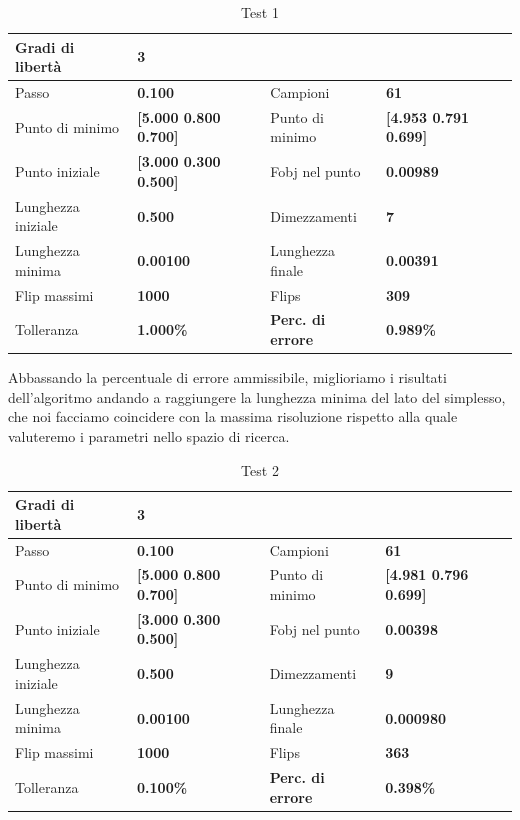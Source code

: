 \documentclass[a4paper, 11pt]{article}
\begin{document}
\begin{table}[h]
	\caption{Test 1}
	\begin{center}
	\begin{tabular}{|l|l|l|l|} 
	\hline 
	Gradi di libertà & \textbf{3} &  &  \\ \hline 
	Passo & \textbf{0.100} & Campioni & \textbf{61} \\ \hline 
	Punto di minimo & \textbf{{[}5.000 0.800 0.700{]}} & Punto di minimo & \textbf{{[}4.953 0.791 0.699{]}} \\ \hline 
	Punto iniziale & \textbf{{[}3.000 0.300 0.500{]}} & Fobj nel punto & \textbf{0.00989} \\ \hline 
	Lunghezza iniziale & \textbf{0.500} & Dimezzamenti & \textbf{7} \\ \hline 
	Lunghezza minima & \textbf{0.00100} & Lunghezza finale & \textbf{0.00391} \\ \hline
	Flip massimi & \textbf{1000} & Flips & \textbf{309} \\ \hline 
	Tolleranza & \textbf{1.000\%} & \textbf{Perc. di errore} & \textbf{0.989\%} \\ \hline 
	\end{tabular}
	\end{center}
	\end{table}

\noindent
Abbassando la percentuale di errore ammissibile, miglioriamo i risultati
dell'algoritmo andando a raggiungere la lunghezza minima del lato del simplesso,
che noi facciamo coincidere con la massima risoluzione rispetto alla quale
valuteremo i parametri nello spazio di ricerca.

\begin{table}[h] 
	\caption{Test 2}
	\begin{center}
	\begin{tabular}{|l|l|l|l|} 
	\hline 
	Gradi di libertà & \textbf{3} &  &  \\ \hline 
	Passo & \textbf{0.100} & Campioni & \textbf{61} \\ \hline 
	Punto di minimo & \textbf{{[}5.000 0.800 0.700{]}} & Punto di minimo & \textbf{{[}4.981 0.796 0.699{]}} \\ \hline 
	Punto iniziale & \textbf{{[}3.000 0.300 0.500{]}} & Fobj nel punto & \textbf{0.00398} \\ \hline 
	Lunghezza iniziale & \textbf{0.500} & Dimezzamenti & \textbf{9} \\ \hline 
	Lunghezza minima & \textbf{0.00100} & Lunghezza finale & \textbf{0.000980} \\ \hline
	Flip massimi & \textbf{1000} & Flips & \textbf{363} \\ \hline 
	Tolleranza & \textbf{0.100\%} & \textbf{Perc. di errore} & \textbf{0.398\%} \\ \hline 
	\end{tabular} 
	\end{center}
	\end{table}
\end{document}
